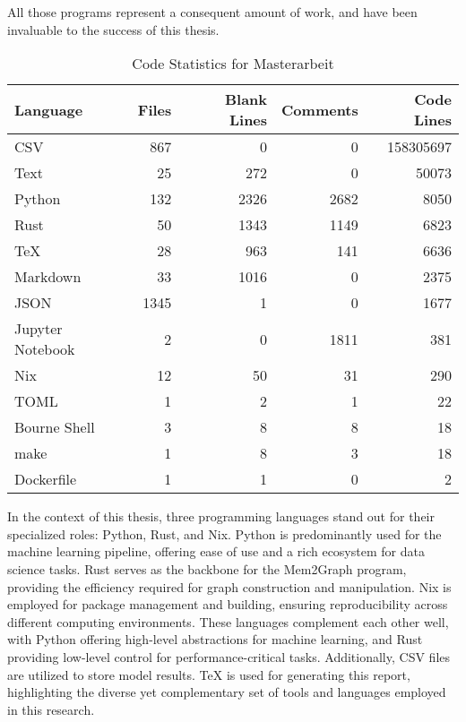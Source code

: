 All those programs represent a consequent amount of work, and have been invaluable to the success of this thesis.

\begin{table}[h]
    \centering
    \caption{Code Statistics for Masterarbeit}
    \label{tab:cloc_output}
    \begin{tabular}{|l|r|r|r|r|}
        \hline
        Language & Files & Blank Lines & Comments & Code Lines \\
        \hline
        CSV & 867 & 0 & 0 & 158305697 \\
        Text & 25 & 272 & 0 & 50073 \\
        Python & 132 & 2326 & 2682 & 8050 \\
        Rust & 50 & 1343 & 1149 & 6823 \\
        TeX & 28 & 963 & 141 & 6636 \\
        Markdown & 33 & 1016 & 0 & 2375 \\
        JSON & 1345 & 1 & 0 & 1677 \\
        Jupyter Notebook & 2 & 0 & 1811 & 381 \\
        Nix & 12 & 50 & 31 & 290 \\
        TOML & 1 & 2 & 1 & 22 \\
        Bourne Shell & 3 & 8 & 8 & 18 \\
        make & 1 & 8 & 3 & 18 \\
        Dockerfile & 1 & 1 & 0 & 2 \\
        \hline
    \end{tabular}
\end{table}

In the context of this thesis, three programming languages stand out for their specialized roles: Python, Rust, and Nix. Python is predominantly used for the machine learning pipeline, offering ease of use and a rich ecosystem for data science tasks. Rust serves as the backbone for the Mem2Graph program, providing the efficiency required for graph construction and manipulation. Nix is employed for package management and building, ensuring reproducibility across different computing environments. These languages complement each other well, with Python offering high-level abstractions for machine learning, and Rust providing low-level control for performance-critical tasks. Additionally, CSV files are utilized to store model results. TeX is used for generating this report, highlighting the diverse yet complementary set of tools and languages employed in this research. 

